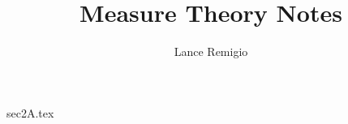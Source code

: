 \documentclass[a4paper]{book}
\title{Measure Theory Notes}
\author{Lance Remigio}
\begin{document}
\maketitle

{sec2A.tex}
\end{document}

